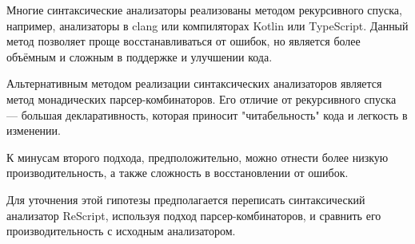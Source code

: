 Многие синтаксические анализаторы реализованы методом рекурсивного спуска,
например, анализаторы в clang или компиляторах Kotlin или TypeScript.
Данный метод позволяет проще восстанавливаться от ошибок,
но является более объёмным и сложным в поддержке и улучшении кода.

Альтернативным методом реализации синтаксических анализаторов является метод монадических парсер-комбинаторов.
Его отличие от рекурсивного спуска --- большая декларативность,
которая приносит "читабельность" кода и легкость в изменении.

К минусам второго подхода, предположительно, можно отнести
более низкую производительность, а также сложность в восстановлении от ошибок.

Для уточнения этой гипотезы предполагается переписать синтакси\-чес\-кий анализатор ReScript,
используя подход парсер-комбинаторов, и сравнить его производительность с исходным анализатором.
